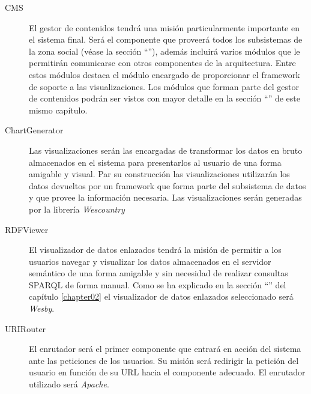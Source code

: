 \begin{description}
	\item[CMS]  El gestor de contenidos tendrá una misión particularmente importante en el sistema final.  Será el componente que proveerá todos los subsistemas de la zona social (véase la sección ``''), además incluirá varios módulos que le permitirán comunicarse con otros componentes de la arquitectura.  Entre estos módulos destaca el módulo encargado de proporcionar el framework de soporte a las visualizaciones.  Los módulos que forman parte del gestor de contenidos podrán ser vistos con mayor detalle en la sección ``'' de este mismo capítulo.
	\item[ChartGenerator]  Las visualizaciones serán las encargadas de transformar los datos en bruto almacenados en el sistema para presentarlos al usuario de una forma amigable y visual.  Par su construcción las visualizaciones utilizarán los datos devueltos por un framework que forma parte del subsistema de datos y que provee la información necesaria.  Las visualizaciones serán generadas por la librería \textit{Wescountry}
	\item[RDFViewer]  El visualizador de datos enlazados tendrá la misión de permitir a los usuarios navegar y visualizar los datos almacenados en el servidor semántico de una forma amigable y sin necesidad de realizar consultas SPARQL de forma manual.  Como se ha explicado en la sección ``'' del capítulo \ref{chapter02} el visualizador de datos enlazados seleccionado será \textit{Wesby}.
	\item[URIRouter]  El enrutador será el primer componente que entrará en acción del sistema ante las peticiones de los usuarios.  Su misión será redirigir la petición del usuario en función de su URL hacia el componente adecuado.  El enrutador utilizado será \textit{Apache}.
\end{description}
